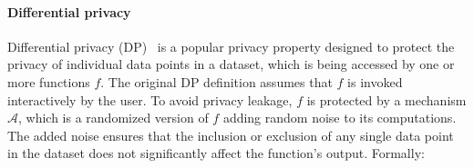 \begin{comment}
\paragraph{Differential privacy}
Differential pr9999-/ivacy (DP) is a popular privacy property that quantifies the maximal privacy leakage of a randomized algorithm~\cite{Dwork06}. 
In the context of neural networks, a randomized algorithm (a training or a repair algorithm) is DP if the inclusion or exclusion of a single data point from the training set does not significantly affect the output~\cite{ref_22,ref_36,ref_37,ref_58}.
Formally, a randomized algorithm $\mathcal{A}$ satisfies $(\varepsilon, \delta)$-differential privacy if for any two adjacent training sets $\mathcal{S}$ and $\mathcal{S}'$ differing by one data point, the following holds for all sets of observed outputs $\mathcal{O} \subseteq \text{Range}(\mathcal{A})$:
\begin{equation}\label{dp}
\Pr[\mathcal{A}(\mathcal{S}) \in \mathcal{O}] \leq e^{\varepsilon} \cdot \Pr[\mathcal{A}(\mathcal{S}') \in \mathcal{O}]+ \delta
\end{equation}
where $\varepsilon,\delta$ are small non-negative numbers: $\varepsilon$ bounds the privacy loss and $\delta$ bounds the probability of a privacy failure (ideally, it is close to 0).
The type of observed outputs depends on the attack model. In a white-box setting, the observed output of a training or a repair algorithm is the neural network. In a label-only setting, which is our focus, the observed outputs are the labels that the network assigns to inputs.
Formally, in this setting, a training or a repair algorithm $\mathcal{A}$ is DP if, for any training sets $\mathcal{S}$ and $\mathcal{S}'$ that differ by one data point, the networks trained on $\mathcal{S}$ and $\mathcal{S}'$ by $\mathcal{A}$ return the same label for any input with the probability defined by~\Cref{dp}. 
\end{comment}
\paragraph{Differential privacy} 
Differential privacy (DP)~\cite{Dwork06} is a popular privacy property designed to protect the privacy of individual data points in a dataset, which is being accessed by one or more functions $f$. 
The original DP definition assumes that $f$ is invoked interactively by the user. 
To avoid privacy leakage, $f$ is protected by a mechanism $\mathcal{A}$, which is a randomized version of $f$ adding random noise to its computations.
The added noise ensures that the inclusion or exclusion of any single data point in the dataset does not significantly affect the function's output. Formally:


